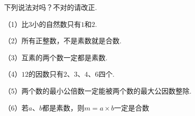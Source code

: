 下列说法对吗？不对的请改正.

（1）比$3$小的自然数只有$1$和$2$.

\vspace{24 pt}
（2）所有正整数，不是素数就是合数.

\vspace{24 pt}
（3）互素的两个数一定都是素数.

\vspace{24 pt}
（4）$12$的因数只有$2$、$3$、$4$、$6$四个.

\vspace{24 pt}
（5）两个数的最小公倍数一定能被两个数的最大公因数整除.

\vspace{24 pt}
（6）若$a$、$b$都是素数，则$m=a \times b$一定是合数